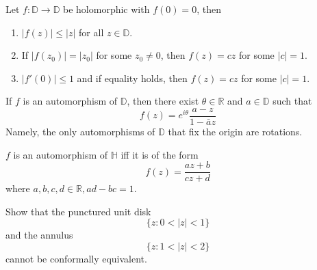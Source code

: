 \documentclass[openany]{book}
\newcommand{\R}{\mathbb{R}}
\newcommand{\D}{\mathbb{D}}
\begin{document}
\begin{prop}
    Let $f:\D\to\D$ be holomorphic with $f(0)=0$, then 
    \begin{enumerate}
        \item $|f(z)|\leq|z|$ for all $z\in\D$.
        \item If $|f(z_0)|=|z_0|$ for some $z_0\neq 0$, then $f(z)=cz$ for some $|c|=1$.
        \item $|f'(0)|\leq 1$ and if equality holds, then $f(z)=cz$ for some $|c|=1$.
    \end{enumerate}
\end{prop}


\begin{prop}
    If $f$ is an automorphism of $\D$, then there exist $\theta\in\R$ and $a\in\D$ such that 
    \begin{equation*}
        f(z)=e^{i\theta}\frac{a-z}{1-\bar{a}z}
    \end{equation*}
    Namely, the only automorphisms of $\D$ that fix the origin are rotations.
\end{prop}


\begin{prop}
    $f$ is an automorphism of $\mathbb{H}$ iff it is of the form
    \begin{equation*}
        f(z)=\frac{az+b}{cz+d}
    \end{equation*}
    where $a,b,c,d\in\R, ad-bc=1$.
\end{prop}


\begin{prob}[Spring 2019, Q4]
Show that the punctured unit disk
\[
\{z:0<|z|<1\}
\]
and the annulus
\[
\{z:1<|z|<2\}
\]
cannot be conformally equivalent.
\end{prob}
\end{document}
